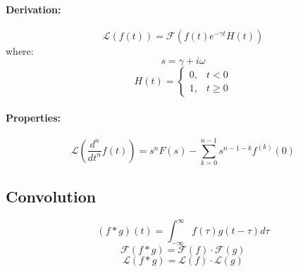\documentclass{article}
\begin{document}
\paragraph{Derivation:}
\[
    \mathcal{L}(f(t)) = \mathcal{F}(f(t) e^{-\gamma t} H(t))
\]
where:
\[
    s = \gamma + i\omega
\]
\[
    H(t) = \begin{cases}
        0, & t < 0 \\
        1, & t \geq 0
    \end{cases}
\]
\paragraph{Properties:}
\[
    \mathcal{L}\left(\frac{d^n}{dt^n} f(t)\right) = s^n F(s) - \sum_{k=0}^{n-1} s^{n-1-k} f^{(k)}(0)
\]

\subsection{Convolution}

\[
    (f * g)(t) = \int_{-\infty}^{\infty} f(\tau) g(t - \tau) d\tau
\]
\[
    \mathcal{F}(f * g) = \mathcal{F}(f) \cdot \mathcal{F}(g)
\]
\[
    \mathcal{L}(f * g) = \mathcal{L}(f) \cdot \mathcal{L}(g)
\]
\end{document}
